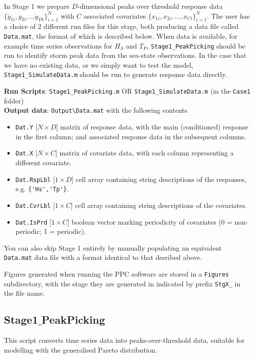 In Stage 1 we prepare $D$-dimensional peaks over threshold response data  $\{\dot{y}_{1i},\dot{y}_{2i},\ldots \dot{y}_{Di}\}_{i=1}^{N}$  with $C$ associated covariates $\{x_{1i},x_{2i},\ldots,x_{Ci}\}_{i=1}^{N}$.  The user has a choice of 2 different run files for this stage, both producing a data file called \verb|Data.mat|, the format of which is described below. When data is available,  for example time series observations for $H_S$ and $T_P$,  \verb|Stage1_PeakPicking| should be run to identify storm peak data from the sea-state observations. In the case that we have no existing data, or we simply want to test the model, \verb|Stage1_SimulateData.m| should be run to generate response data directly.

\textbf{Run Scripts}: \verb|Stage1_PeakPicking.m| OR \verb|Stage1_SimulateData.m| (in the \verb|Case1| folder)\\
\textbf{Output data}: \verb|Output\Data.mat| with the following contents
\begin{itemize}
	\item  \verb|Dat.Y| [$N \times D$] matrix of response data, with the main (conditioned) response in the first column; and associated response data in the subsequent columns.
	\item \verb|Dat.X| [$N \times C$] matrix of covariate data, with each column representing a different covariate.
	\item \verb|Dat.RspLbl| [$1 \times D$] cell array containing string descriptions of the responses, e.g. \verb|{'Hs','Tp'}|.
	\item \verb|Dat.CvrLbl| [$1 \times C$] cell array containing string descriptions of the covariates.
	\item \verb|Dat.IsPrd| [$1 \times C$] boolean vector marking periodicity of covariates (0 = non-periodic; 1 = periodic).
\end{itemize}
You can also skip Stage 1 entirely by manually populating an equivalent \verb|Data.mat| data file with a format identical to that desribed above. 
 
Figures generated when running the PPC software are stored in a \verb|Figures| subdirectory, with the stage they are generated in indicated by prefix \verb|StgX_| in the file name. 

\subsection{Stage1$\_$PeakPicking} %
This script converts time series data into peaks-over-threshold data, suitable for modelling with the generalised Pareto distribution. 

